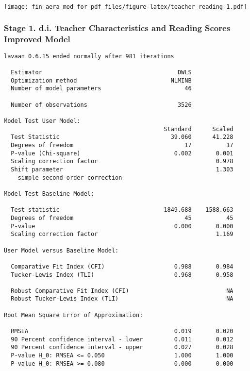 \documentclass[
]{article}
\begin{document}
\texttt{[image: fin\_aera\_mod\_for\_pdf\_files/figure-latex/teacher\_reading-1.pdf]}

\hypertarget{stage-1.-d.i.-teacher-characteristics-and-reading-scores-improved-model}{%
\subsubsection{Stage 1. d.i. Teacher Characteristics and Reading Scores
Improved
Model}\label{stage-1.-d.i.-teacher-characteristics-and-reading-scores-improved-model}}

\begin{verbatim}
lavaan 0.6.15 ended normally after 981 iterations

  Estimator                                       DWLS
  Optimization method                           NLMINB
  Number of model parameters                        46

  Number of observations                          3526

Model Test User Model:
                                              Standard      Scaled
  Test Statistic                                39.060      41.228
  Degrees of freedom                                17          17
  P-value (Chi-square)                           0.002       0.001
  Scaling correction factor                                  0.978
  Shift parameter                                            1.303
    simple second-order correction                                

Model Test Baseline Model:

  Test statistic                              1849.688    1588.663
  Degrees of freedom                                45          45
  P-value                                        0.000       0.000
  Scaling correction factor                                  1.169

User Model versus Baseline Model:

  Comparative Fit Index (CFI)                    0.988       0.984
  Tucker-Lewis Index (TLI)                       0.968       0.958
                                                                  
  Robust Comparative Fit Index (CFI)                            NA
  Robust Tucker-Lewis Index (TLI)                               NA

Root Mean Square Error of Approximation:

  RMSEA                                          0.019       0.020
  90 Percent confidence interval - lower         0.011       0.012
  90 Percent confidence interval - upper         0.027       0.028
  P-value H_0: RMSEA <= 0.050                    1.000       1.000
  P-value H_0: RMSEA >= 0.080                    0.000       0.000
                                                                  

\end{verbatim}
\end{document}

